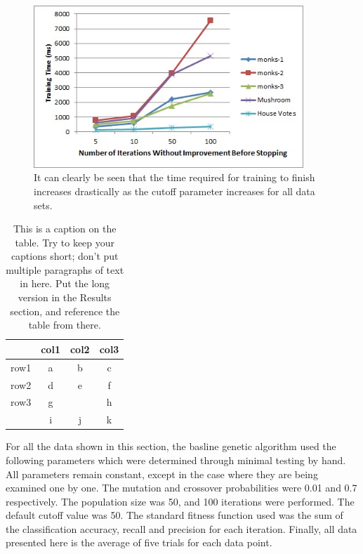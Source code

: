 \documentclass[12pt, letterpaper]{article}
\begin{document}
\begin{figure}[!htb]
\begin{center}
\includegraphics[width=4in]{images/cutoff_time.jpg}
\end{center}
\caption{It can clearly be seen that the time required for training to finish
increases drastically as the cutoff parameter increases for all data sets. 
}
\label{Testing Times of Multiple Decision Trees}
\end{figure}

\begin{table}
\begin{center}
\begin{tabular}{|c||c|cc}
\hline
& col1 & col2 & col3\\
\hline \hline
row1 & a & b & c\\
\hline 
row2 & d & e & f\\
\hline 
row3 & g &   & h\\
 & i & j & k\\
\hline 
\end{tabular}
\end{center}
\caption{This is a caption on the table.  Try to keep your captions short; don't
put multiple paragraphs of text in here.  Put the long version in the Results
section, and reference the table from there.}
\label{sometable}
\end{table}

For all the data shown in this section, the basline genetic algorithm used the 
following parameters which were determined through minimal testing by hand.  
All parameters remain constant, except in the case where they are being
examined one by one.  The mutation and crossover probabilities were 0.01 and 
0.7 respectively.  The population size was 50, and 100 iterations were 
performed.  The default cutoff value was 50.
The standard fitness function used was the sum of the classification accuracy,
recall and precision for each iteration.  Finally, all data presented here is 
the average of five trials for each data point.  
\end{document}
